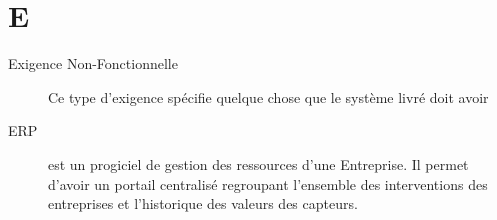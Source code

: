 \section{E}

\begin{description}

\item[Exigence Non-Fonctionnelle] Ce type d'exigence spécifie quelque chose que 
le système livré doit avoir

\item[ERP] est un progiciel de gestion des ressources d'une Entreprise. 
Il permet d'avoir un portail centralisé regroupant l'ensemble des interventions 
des entreprises et l'historique des valeurs des capteurs.


\end{description}
